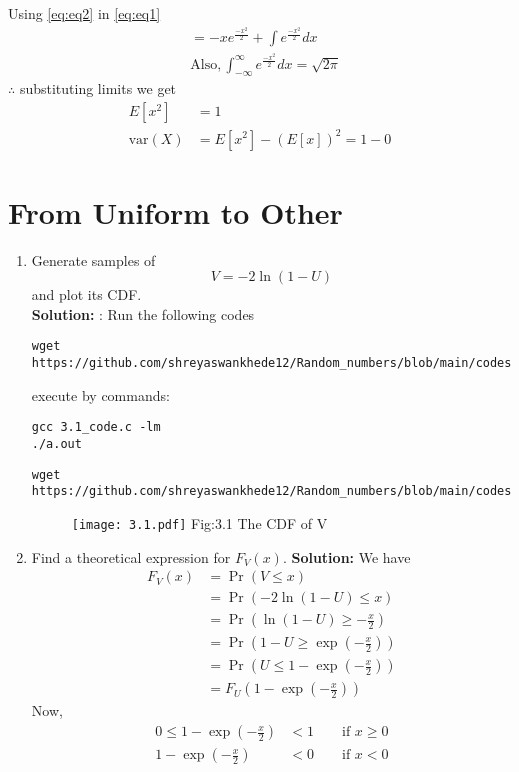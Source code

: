 \documentclass[journal,12pt,twocolumn]{IEEEtran}
\renewcommand\thesection{\arabic{section}}
\providecommand{\pr}[1]{\ensuremath{\Pr\left(#1\right)}}
\providecommand{\brak}[1]{\ensuremath{\left(#1\right)}}
\theoremstyle{remark}
\newcommand{\solution}{\noindent \textbf{Solution: }}
\numberwithin{equation}{section}
\begin{document}
 Using \eqref{eq:eq2} in \eqref{eq:eq1}
 \begin{align}
&= -x e^{\frac{-x^2}{2}}+\int e^{\frac{-x^2}{2}} dx\\
&\text{Also} ,\int_{-\infty}^{\infty} e^{\frac{-x^2}{2}} dx=\sqrt{2 \pi} 
\end{align}
$\therefore$ substituting limits we get
\begin{align}
 E[x^2]&=1\\
 \text{var}(X)&=E[x^2]-(E[x])^2=1-0
\end{align}
 
\section{From Uniform to Other}
\begin{enumerate}[label=\thesection.\arabic*
,ref=\thesection.\theenumi]
%
\item
Generate samples of 
%
\begin{equation}
V = -2\ln\brak{1-U}
\end{equation}
%
and plot its CDF. \\
\solution: Run the following codes
\begin{lstlisting}
wget https://github.com/shreyaswankhede12/Random_numbers/blob/main/codes/3.1_code.c
\end{lstlisting}
execute by commands:
\begin{lstlisting}
gcc 3.1_code.c -lm
./a.out
\end{lstlisting}
\begin{lstlisting}
wget https://github.com/shreyaswankhede12/Random_numbers/blob/main/codes/3.1_plot.py
\end{lstlisting}
\begin{figure}
\centering
\texttt{[image: 3.1.pdf]}
Fig:3.1  The CDF of V
\end{figure}
\item Find a theoretical expression for $F_V(x)$.
\solution We have
	\begin{align}
		F_V(x) &= \pr{V \le x} \\
		&= \pr{-2\ln\brak{1-U} \le x} \\
		&= \pr{\ln\brak{1-U} \ge -\frac{x}{2}} \\
		&= \pr{1-U \ge \exp\brak{-\frac{x}{2}}} \\
		&= \pr{U \le 1 - \exp\brak{-\frac{x}{2}}} \\
		&= F_U\brak{1 - \exp\brak{-\frac{x}{2}}}
	\end{align}
	Now,
	\begin{align}
		0 \le 1-\exp\brak{-\frac{x}{2}} &< 1 \qquad \text{if } x \ge 0	\\	
		1-\exp\brak{-\frac{x}{2}} &< 0 \qquad \text{if } x < 0	
	\end{align}
	

\end{enumerate}
\end{document}
